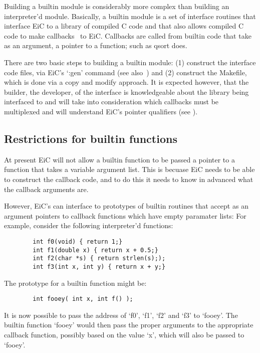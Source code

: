         Building a builtin module is considerably more complex than
building an interpreter'd module. Basically, a builtin module is a set
of interface routines that interface EiC to a library of compiled C
code and that also allows compiled C code to make
callbacks~ to EiC. Callbacks are called from builtin
code that take as an argument, a pointer to a function; such as qsort
does.


There are two basic steps to building a builtin module: (1) construct
the interface code files, via EiC's `:gen' command (see
also~) and (2) construct the Makefile, which is done
via a copy and modify approach. It is expected however, that the
builder, the developer, of the interface is knowledgeable about the
library being interfaced to and will take into consideration which
callbacks must be multiplexed and will understand EiC's pointer
qualifiers (see ).


\subsection{Restrictions for builtin functions}
\label{sec:restrictions}


At present EiC will not allow a builtin function to be passed a
pointer to a function that takes a variable argument list.  This is
becuase EiC needs to be able to construct the callback code, and to do
this it needs to know in advanced what the callback arguments are.

However, EiC's can interface to prototypes of builtin routines that
accept as an argument pointers to callback functions which have empty
paramater lists: For example, consider the following interpreter'd
functions:

\small
\begin{verbatim}
        int f0(void) { return 1;}
        int f1(double x) { return x + 0.5;}
        int f2(char *s) { return strlen(s););
        int f3(int x, int y) { return x + y;}
\end{verbatim}
\normalsize

The prototype for a builtin function might be:

\small
\begin{verbatim}
        int fooey( int x, int f() );
\end{verbatim}
\normalsize

It is now possible to pass the address of `f0', `f1', `f2' and `f3' to
`fooey'. The builtin function `fooey' would then pass the proper
arguments to the appropriate callback function, possibly based
on the value `x', which will also be passed to `fooey'.


